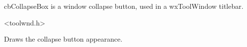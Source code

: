 %
%


\section{}\label{cbcollapsebox}


cbCollapseBox is a window collapse button, used in a wxToolWindow titlebar.




<toolwnd.h>




\label{cbcollapseboxdraw}


Draws the collapse button appearance.

